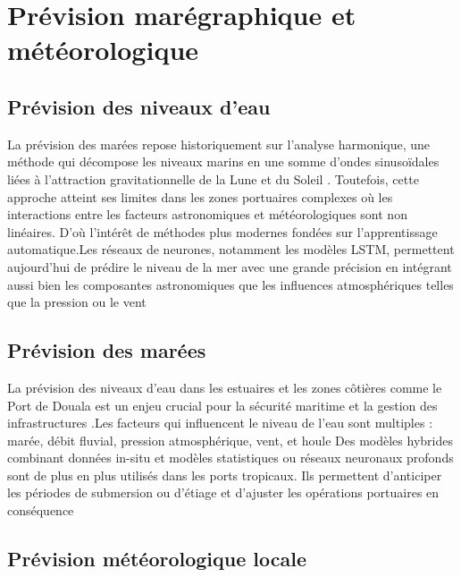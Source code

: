 \documentclass[a4paper,12pt,openany]{report}
\begin{document}
	\begin{minipage}{\textwidth}
	
	\end{minipage}
	
\section{Prévision marégraphique et météorologique}

	\subsection{Prévision des niveaux d’eau}
	
	\quad La prévision des marées repose historiquement sur l’analyse harmonique, une méthode qui décompose les niveaux marins en une somme d’ondes sinusoïdales liées à l’attraction gravitationnelle de la Lune et du Soleil \cite{Pugh2014}.
	Toutefois, cette approche atteint ses limites dans les zones portuaires complexes où les interactions entre les facteurs astronomiques et météorologiques sont non linéaires. D’où l’intérêt de méthodes plus modernes fondées sur l’apprentissage automatique\cite{Fernandes2020}.Les réseaux de neurones, notamment les modèles LSTM, permettent aujourd’hui de prédire le niveau de la mer avec une grande précision en intégrant aussi bien les composantes astronomiques que les influences atmosphériques telles que la pression ou le vent\cite{Wang2021} 
	\subsection{Prévision des marées}
	\quad La prévision des niveaux d’eau dans les estuaires et les zones côtières comme le Port de Douala est un enjeu crucial pour la sécurité maritime et la gestion des infrastructures\cite{Ngatcha2021} .Les facteurs qui influencent le niveau de l’eau sont multiples : marée, débit fluvial, pression atmosphérique, vent, et houle\cite{Zhou2022}
	Des modèles hybrides combinant données in-situ et modèles statistiques ou réseaux neuronaux profonds sont de plus en plus utilisés dans les ports tropicaux. Ils permettent d’anticiper les périodes de submersion ou d’étiage et d’ajuster les opérations portuaires en conséquence \cite{Zhang2020}
	
\subsection{Prévision météorologique locale}
\end{document}
